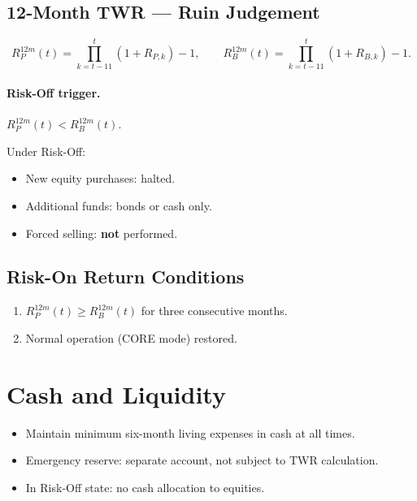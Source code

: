\subsection{12-Month TWR --- Ruin Judgement}
\label{sec:invest-12m-twr}

\begin{equation}
R_P^{12m}(t) = \prod_{k=t-11}^{t} (1 + R_{P,k}) - 1,
\qquad
R_B^{12m}(t) = \prod_{k=t-11}^{t} (1 + R_{B,k}) - 1.
\end{equation}

\paragraph{Risk-Off trigger.}
$R_P^{12m}(t) < R_B^{12m}(t)$.

\noindent
Under Risk-Off:
\begin{itemize}
\item New equity purchases: halted.
\item Additional funds: bonds or cash only.
\item Forced selling: \textbf{not} performed.
\end{itemize}

\subsection{Risk-On Return Conditions}
\label{sec:invest-risk-on}

\begin{enumerate}
\item $R_P^{12m}(t) \ge R_B^{12m}(t)$ for three consecutive months.
\item Normal operation (CORE mode) restored.
\end{enumerate}

\section{Cash and Liquidity}
\label{sec:invest-liquidity}

\begin{itemize}
\item Maintain minimum six-month living expenses in cash at all
times.
\item Emergency reserve: separate account, not subject to TWR
calculation.
\item In Risk-Off state: no cash allocation to equities.
\end{itemize}

